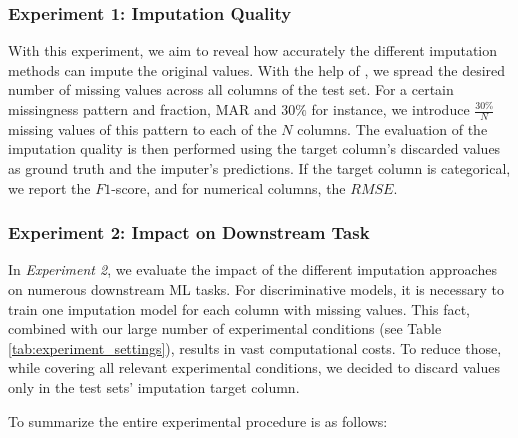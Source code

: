 \subsubsection{Experiment 1: Imputation Quality}
\label{sec:experiment_1}
%
With this experiment, we aim to reveal how accurately the different imputation methods can impute the original values.
With the help of , we spread the desired number of missing values across all columns of the test set. For a certain missingness pattern and fraction, MAR and $30\%$ for instance, we introduce $\frac{30\%}{N}$ missing values of this pattern to each of the $N$ columns.
%
The evaluation of the imputation quality is then performed using the target column's discarded values as ground truth and the imputer's predictions. If the target column is categorical, we report the $F1$-score, and for numerical columns, the $RMSE$.


\subsubsection{Experiment 2: Impact on Downstream Task}
\label{sec:experiment_2}
%
In \emph{Experiment 2}, we evaluate the impact of the different imputation approaches on numerous downstream ML tasks. For discriminative models, it is necessary to train one imputation model for each column with missing values. This fact, combined with our large number of experimental conditions (see Table \ref{tab:experiment_settings}), results in vast computational costs. To reduce those, while covering all relevant experimental conditions, we decided to discard values only in the test sets’ imputation target column. 

To summarize the entire experimental procedure is as follows:

